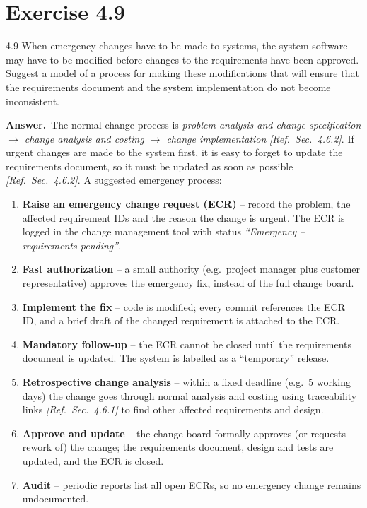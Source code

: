 \documentclass[11pt,a4paper]{article}
\newcommand{\answer}{\par\noindent\textbf{Answer.}\ }
\newcommand{\refsec}[1]{\hfill\textit{\small[Ref.\ Sec.~#1]}}
\begin{document}
\section*{Exercise 4.9}
\begin{question}{4.9}
When emergency changes have to be made to systems, the system software may have to be modified before
changes to the requirements have been approved. Suggest a model of a process for making these
modifications that will ensure that the requirements document and the system implementation do not
become inconsistent.
\end{question}
\answer The normal change process is \emph{problem analysis and change specification $\rightarrow$
change analysis and costing $\rightarrow$ change implementation} \refsec{4.6.2}. If urgent changes are
made to the system first, it is easy to forget to update the requirements document, so it must be
updated as soon as possible \refsec{4.6.2}. A suggested emergency process:
\begin{enumerate}[leftmargin=*]
  \item \textbf{Raise an emergency change request (ECR)} -- record the problem, the affected
  requirement IDs and the reason the change is urgent. The ECR is logged in the change management tool
  with status \emph{``Emergency -- requirements pending''}.
  \item \textbf{Fast authorization} -- a small authority (e.g.\ project manager plus customer
  representative) approves the emergency fix, instead of the full change board.
  \item \textbf{Implement the fix} -- code is modified; every commit references the ECR ID, and a brief
  draft of the changed requirement is attached to the ECR.
  \item \textbf{Mandatory follow-up} -- the ECR cannot be closed until the requirements document is
  updated. The system is labelled as a ``temporary'' release.
  \item \textbf{Retrospective change analysis} -- within a fixed deadline (e.g.\ 5 working days) the
  change goes through normal analysis and costing using traceability links \refsec{4.6.1} to find other
  affected requirements and design.
  \item \textbf{Approve and update} -- the change board formally approves (or requests rework of) the
  change; the requirements document, design and tests are updated, and the ECR is closed.
  \item \textbf{Audit} -- periodic reports list all open ECRs, so no emergency change remains undocumented.
\end{enumerate}
\end{document}
